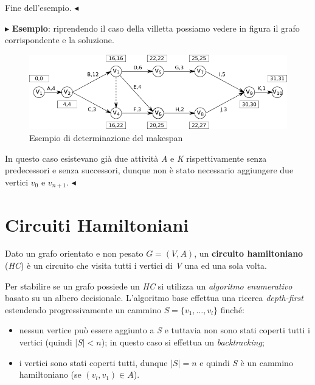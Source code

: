 \documentclass[11pt]{book}
\begin{document}
Fine dell'esempio. $\blacktriangleleft$
\vspace{11pt}

\vspace{11pt} $\blacktriangleright$ {\bf Esempio}: riprendendo il caso
della villetta possiamo vedere in figura il grafo corrispondente e la
soluzione.

\begin{figure}[H]
  \centering
  \includegraphics[width=\textwidth]{images/cap7figura716.png}
  \caption{Esempio di determinazione del makespan}
  \label{cap7figura716}
\end{figure}

In questo caso esistevano gi\`a due attivit\`a {\em A} e {\em K}
rispettivamente senza predecessori e senza successori, dunque non \`e
stato necessario aggiungere due vertici $v_0$ e
$v_{n+1}$. $\blacktriangleleft$
\vspace{11pt}

\section{Circuiti Hamiltoniani}

Dato un grafo orientato e non pesato $G=(V,A)$, un {\bf circuito
  hamiltoniano} ({\em HC}) \`e un circuito che visita tutti i vertici
di {\em V} una ed una sola volta.

Per stabilire se un grafo possiede un {\em HC} si utilizza un
{\em algoritmo enumerativo} basato su un albero
decisionale. L'algoritmo base effettua una ricerca {\em depth-first}
estendendo progressivamente un cammino $S = \{v_1,\dots,v_l\}$
finch\'e:

\begin{itemize}
\item nessun vertice pu\`o essere aggiunto a {\em S} e tuttavia non
  sono stati coperti tutti i vertici (quindi $|S|<n$); in questo caso
  si effettua un {\em backtracking};
\item i vertici sono stati coperti tutti, dunque $|S| = n$ e quindi
  $S$ \`e un cammino hamiltoniano (se $(v_l,v_1) \in A$).
\end{itemize}
\end{document}

